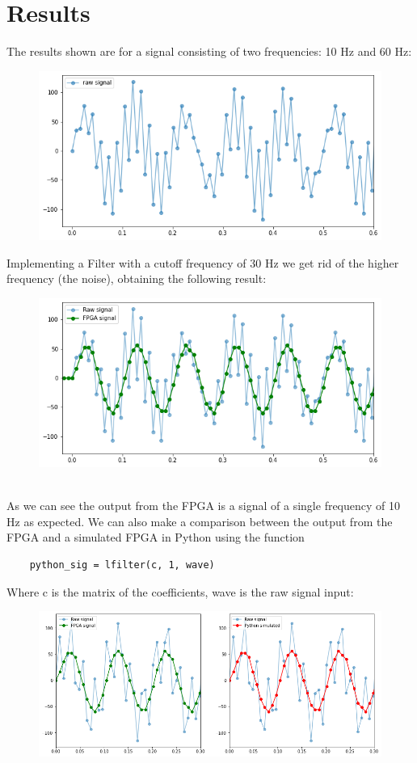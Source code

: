 \documentclass[11pt,a4paper,twocolumn]{IEEEtran}
\begin{document}
	\section{Results}
	The results shown are for a signal consisting of two frequencies: 10 Hz and 60 Hz: 
	\begin{figure}[h]
		\centering
		\includegraphics[width=.9\linewidth]{img/rawsig}
	\end{figure}
	Implementing a Filter with a cutoff frequency of 30 Hz we get rid of the higher frequency (the noise), obtaining the following result:
	\begin{figure}[h]
		\centering
		\includegraphics[width=.9\linewidth]{img/fpgaresult}
	\end{figure}\\
	As we can see the output from the FPGA is a signal of a single frequency of 10 Hz as expected. We can also make a comparison between the output from the FPGA and a simulated FPGA in Python using the function
	\begin{lstlisting}
	python_sig = lfilter(c, 1, wave)
	\end{lstlisting}
	Where c is the matrix of the coefficients, wave is the raw signal input:
	\begin{figure}[h]
		\centering
		\includegraphics[width=.9\linewidth]{img/fpgapython}
	\end{figure}
\end{document}

